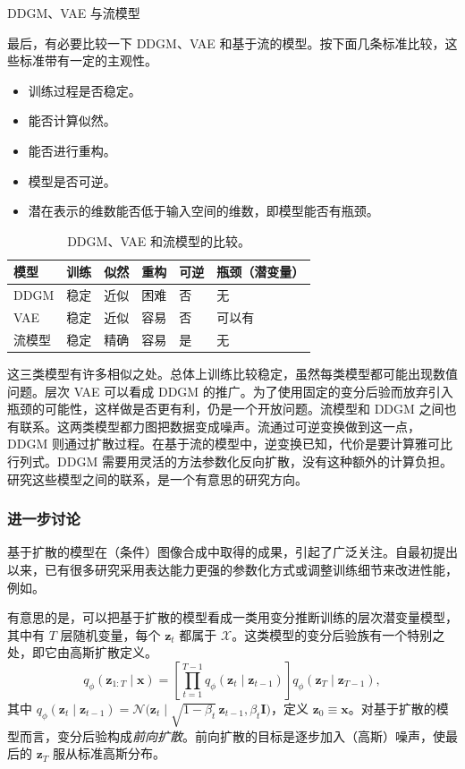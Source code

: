 \medskip\noindent DDGM、VAE 与流模型\par\smallskip
最后，有必要比较一下 DDGM、VAE 和基于流的模型。按下面几条标准比较，这些标准带有一定的主观性。
\begin{itemize}
\item 训练过程是否稳定。
\item 能否计算似然。
\item 能否进行重构。
\item 模型是否可逆。
\item 潜在表示的维数能否低于输入空间的维数，即模型能否有瓶颈。
\end{itemize}
\begin{table}[htbp]
\caption{DDGM、VAE 和流模型的比较。}
\label{tab:05-01}
\centering
\begin{tabular}{l|l|l|l|l|l}
\hline
模型 & 训练 & 似然 & 重构 & 可逆 & 瓶颈（潜变量）\\
\hline
DDGM & 稳定 & 近似 & 困难 & 否 & 无\\
\hline
VAE & 稳定 & 近似 & 容易 & 否 & 可以有\\
\hline
流模型 & 稳定 & 精确 & 容易 & 是 & 无\\
\hline
\end{tabular}
\end{table}

这三类模型有许多相似之处。总体上训练比较稳定，虽然每类模型都可能出现数值问题。层次 VAE 可以看成 DDGM 的推广。为了使用固定的变分后验而放弃引入瓶颈的可能性，这样做是否更有利，仍是一个开放问题。流模型和 DDGM 之间也有联系。这两类模型都力图把数据变成噪声。流通过可逆变换做到这一点，DDGM 则通过扩散过程。在基于流的模型中，逆变换已知，代价是要计算雅可比行列式。DDGM 需要用灵活的方法参数化反向扩散，没有这种额外的计算负担。研究这些模型之间的联系，是一个有意思的研究方向。

\subsubsection{进一步讨论}
基于扩散的模型在（条件）图像合成中取得的成果，引起了广泛关注。自最初提出以来，已有很多研究采用表达能力更强的参数化方式或调整训练细节来改进性能，例如。

有意思的是，可以把基于扩散的模型看成一类用变分推断训练的层次潜变量模型，其中有 $T$ 层随机变量，每个 $\mathbf{z}_t$ 都属于 $\mathcal{X}$。这类模型的变分后验族有一个特别之处，即它由高斯扩散定义。
\begin{equation}
q_\phi(\mathbf{z}_{1:T}\mid\mathbf{x})=\left[\prod_{t=1}^{T-1}q_\phi(\mathbf{z}_t\mid\mathbf{z}_{t-1})\right]
 q_\phi(\mathbf{z}_T\mid\mathbf{z}_{T-1}),
\tag{5.103}\label{eq:05-103}
\end{equation}
其中 $q_\phi(\mathbf{z}_t\mid\mathbf{z}_{t-1})=\mathcal{N}\bigl(\mathbf{z}_t\mid\sqrt{1-\beta_t}\,\mathbf{z}_{t-1},\beta_t\mathbf{I}\bigr)$，定义 $\mathbf{z}_0\equiv\mathbf{x}$。对基于扩散的模型而言，变分后验构成\emph{前向扩散}。前向扩散的目标是逐步加入（高斯）噪声，使最后的 $\mathbf{z}_T$ 服从标准高斯分布。


